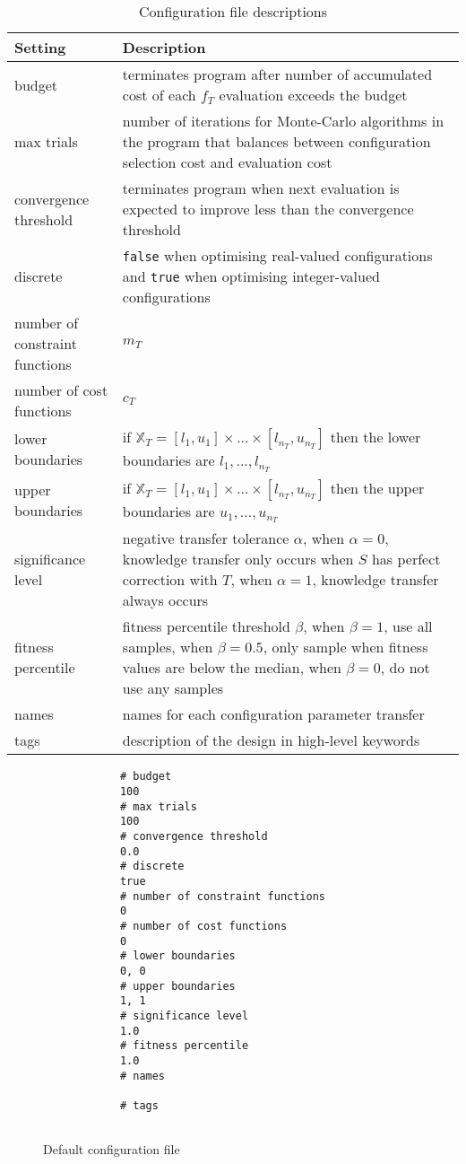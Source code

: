 \documentclass[10pt,a4paper]{article}
\begin{document}
\noindent
\begin{table}[H]
	\begin{tabularx}{\linewidth}{l X}
		\hline
		Setting & Description\\
		\hline
		budget & terminates program after number of accumulated cost of each $f_T$ evaluation exceeds the budget\\
		max trials & number of iterations for Monte-Carlo algorithms in the program that balances between configuration selection cost and evaluation cost\\
		convergence threshold & terminates program when next evaluation is expected to improve less than the convergence threshold\\
		discrete & \verb|false| when optimising real-valued configurations and \verb|true| when optimising integer-valued configurations\\
		number of constraint functions & $m_T$\\
		number of cost functions & $c_T$\\
		lower boundaries & if $\mathbb{X}_T=[l_1,u_1]\times...\times[l_{n_T},u_{n_T}]$ then the lower boundaries are $l_1,...,l_{n_T}$\\
		upper boundaries & if $\mathbb{X}_T=[l_1,u_1]\times...\times[l_{n_T},u_{n_T}]$ then the upper boundaries are $u_1,...,u_{n_T}$\\
		significance level & negative transfer tolerance $\alpha$, when $\alpha=0$, knowledge transfer only occurs when $S$ has perfect correction with $T$, when $\alpha=1$, knowledge transfer always occurs\\
		fitness percentile & fitness percentile threshold $\beta$, when $\beta=1$, use all samples, when $\beta=0.5$, only sample when fitness values are below the median, when $\beta=0$, do not use any samples\\
		names & names for each configuration parameter transfer\\
		tags & description of the design in high-level keywords\\
		\hline
	\end{tabularx}
	\caption{Configuration file descriptions}
\end{table}

\begin{figure}[H]
	\begin{framed}
		\begin{verbatim}
			# budget
			100
			# max trials
			100
			# convergence threshold
			0.0
			# discrete
			true
			# number of constraint functions
			0
			# number of cost functions
			0
			# lower boundaries
			0, 0
			# upper boundaries
			1, 1
			# significance level
			1.0
			# fitness percentile
			1.0
			# names
			
			# tags
			
		\end{verbatim}
	\end{framed}
	\caption{Default configuration file}
\end{figure}
\end{document}
